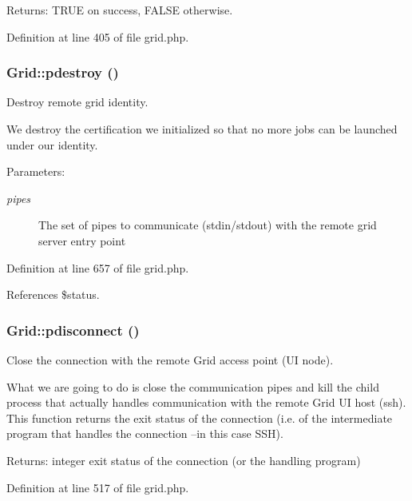 \begin{Desc}
\item[Returns:]TRUE on success, FALSE otherwise. \end{Desc}


Definition at line 405 of file grid.php.
\subsubsection{\setlength{\rightskip}{0pt plus 5cm}Grid::pdestroy ()}\label{classGrid_a12}


Destroy remote grid identity. 

We destroy the certification we initialized so that no more jobs can be launched under our identity.

\begin{Desc}
\item[Parameters:]
\begin{description}
\item[{\em pipes}]The set of pipes to communicate (stdin/stdout) with the remote grid server entry point \end{description}
\end{Desc}


Definition at line 657 of file grid.php.

References \$status.
\subsubsection{\setlength{\rightskip}{0pt plus 5cm}Grid::pdisconnect ()}\label{classGrid_a10}


Close the connection with the remote Grid access point (UI node). 

What we are going to do is close the communication pipes and kill the child process that actually handles communication with the remote Grid UI host (ssh). This function returns the exit status of the connection (i.e. of the intermediate program that handles the connection --in this case SSH).

\begin{Desc}
\item[Returns:]integer exit status of the connection (or the handling program) \end{Desc}


Definition at line 517 of file grid.php.

